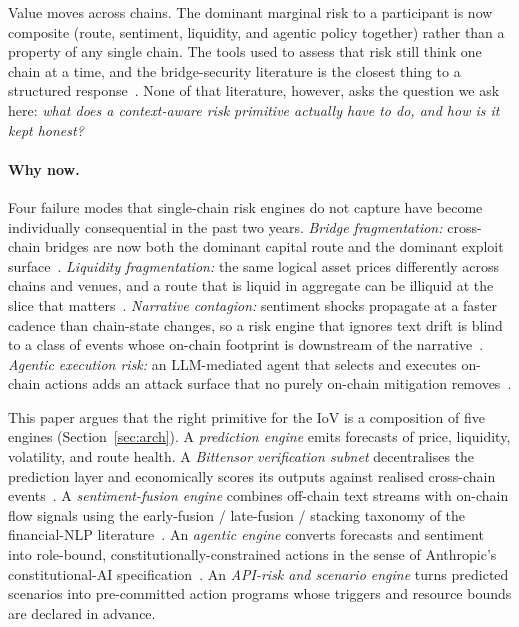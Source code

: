 \documentclass[11pt,a4paper]{article}
\begin{document}
Value moves across chains. The dominant marginal risk to a participant is
now composite (route, sentiment, liquidity, and agentic policy together)
rather than a property of any single chain. The tools used to assess that
risk still think one chain at a time, and the bridge-security literature
is the closest thing to a structured response~\cite{augusto2024sok,
zhang2023sok,belchior2021survey,wu2025safeguarding}. None of that
literature, however, asks the question we ask here: \emph{what does a
context-aware risk primitive actually have to do, and how is it kept
honest?}

\paragraph{Why now.} Four failure modes that single-chain risk engines do
not capture have become individually consequential in the past two years.
\emph{Bridge fragmentation:} cross-chain bridges are now both the dominant
capital route and the dominant exploit
surface~\cite{augusto2024sok}. \emph{Liquidity fragmentation:} the same
logical asset prices differently across chains and venues, and a route that
is liquid in aggregate can be illiquid at the slice that
matters~\cite{zhang2023sok}. \emph{Narrative contagion:} sentiment shocks
propagate at a faster cadence than chain-state changes, so a risk engine
that ignores text drift is blind to a class of events whose on-chain
footprint is downstream of the
narrative~\cite{schumaker2009textual}. \emph{Agentic execution risk:} an
LLM-mediated agent that selects and executes on-chain actions adds an
attack surface that no purely on-chain mitigation
removes~\cite{bai2022constitutional}.

This paper argues that the right primitive for the IoV is a composition
of five engines (Section~\ref{sec:arch}). A \emph{prediction engine}
emits forecasts of price, liquidity, volatility, and route health. A
\emph{Bittensor verification subnet} decentralises the prediction layer
and economically scores its outputs against
realised cross-chain events~\cite{rao2021bittensor,steeves2022incentivizing,
opentensor2024yuma}. A \emph{sentiment-fusion engine} combines off-chain
text streams with on-chain flow signals using the early-fusion /
late-fusion / stacking taxonomy of the financial-NLP
literature~\cite{schumaker2009textual,xing2018natural,day2016deep}. An
\emph{agentic engine} converts forecasts and sentiment into role-bound,
constitutionally-constrained actions in the sense of Anthropic's
constitutional-AI specification~\cite{bai2022constitutional}. An
\emph{API-risk and scenario engine} turns predicted scenarios into
pre-committed action programs whose triggers and resource bounds are
declared in advance.
\end{document}
